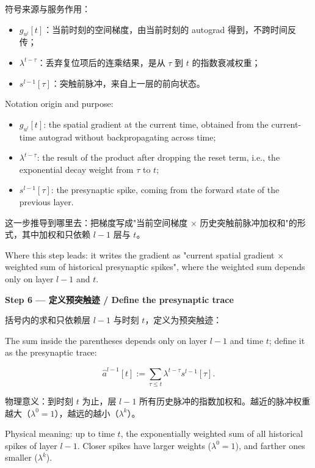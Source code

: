 \documentclass[journal,12pt,onecolumn]{IEEEtran}
\begin{document}
符号来源与服务作用：
\begin{itemize}[leftmargin=1.5em,itemsep=2pt]
\item $g_{u^l}[t]$：当前时刻的空间梯度，由当前时刻的 autograd 得到，不跨时间反传；
\item $\lambda^{t-\tau}$：丢弃复位项后的连乘结果，是从 $\tau$ 到 $t$ 的指数衰减权重；
\item $s^{l-1}[\tau]$：突触前脉冲，来自上一层的前向状态。
\end{itemize}

Notation origin and purpose:
\begin{itemize}[leftmargin=1.5em,itemsep=2pt]
\item $g_{u^l}[t]$: the spatial gradient at the current time, obtained from the current-time autograd without backpropagating across time;
\item $\lambda^{t-\tau}$: the result of the product after dropping the reset term, i.e., the exponential decay weight from $\tau$ to $t$;
\item $s^{l-1}[\tau]$: the presynaptic spike, coming from the forward state of the previous layer.
\end{itemize}

这一步推导到哪里去：把梯度写成"当前空间梯度 $\times$ 历史突触前脉冲加权和"的形式，其中加权和只依赖 $l-1$ 层与 $t$。

Where this step leads: it writes the gradient as "current spatial gradient $\times$ weighted sum of historical presynaptic spikes", where the weighted sum depends only on layer $l-1$ and $t$.

\medskip\noindent\textbf{Step 6 — 定义预突触迹 / Define the presynaptic trace}

括号内的求和只依赖层 $l-1$ 与时刻 $t$，定义为预突触迹：

The sum inside the parentheses depends only on layer $l-1$ and time $t$; define it as the presynaptic trace:

\begin{equation}
\hat{a}^{l-1}[t] := \sum_{\tau\le t} \lambda^{t-\tau} s^{l-1}[\tau].
\end{equation}

物理意义：到时刻 $t$ 为止，层 $l-1$ 所有历史脉冲的指数加权和。越近的脉冲权重越大（$\lambda^0=1$），越远的越小（$\lambda^k$）。

Physical meaning: up to time $t$, the exponentially weighted sum of all historical spikes of layer $l-1$. Closer spikes have larger weights ($\lambda^0=1$), and farther ones smaller ($\lambda^k$).
\end{document}
